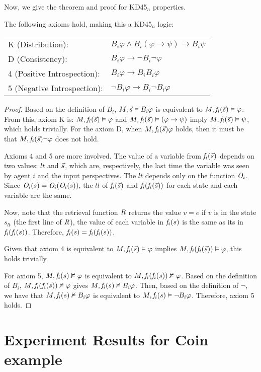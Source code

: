 \documentclass[letterpaper]{article} %
\begin{document}
Now, we give the theorem and proof for KD45$_n$ properties.
\begin{theorem}
\label{pos:kd45}
The following axioms hold, making this a KD45$_n$ logic:

\noindent
\vspace{2mm}
\begin{tabular}{l@{~~}l}
	K (Distribution):           & $B_i \varphi \land B_i(\varphi \rightarrow \psi) \rightarrow B_i \psi $\\[1mm]
	D (Consistency):            & $B_i \varphi \rightarrow \neg B_i \neg \varphi $\\[1mm]
	4 (Positive Introspection): & $B_i \varphi \rightarrow  B_i B_i \varphi $\\[1mm]
	5 (Negative Introspection): & $\neg B_i \varphi \rightarrow B_i \neg B_i \varphi $\\[1mm]
\end{tabular} 
\end{theorem}

\begin{proof}
    Based on the definition of $B_i$, $M,\Vec{s} \vDash B_i \varphi$ is equivalent to $M,\mathit{f}_i(\Vec{s}) \vDash \varphi$.
    From this, axiom K is: $M,\mathit{f}_i(\Vec{s}) \vDash \varphi$ and $M,\mathit{f}_i(\Vec{s}) \vDash (\varphi \rightarrow \psi)$ imply $M,\mathit{f}_i(\Vec{s}) \vDash \psi$, which holds trivially.
    For the axiom D, when $M,\mathit{f}_i(\Vec{s}) \varphi$ holds, then it must be that  $M,\mathit{f}_i(\Vec{s}) \neg \varphi$ does not hold.

    Axioms 4 and 5 are more involved.
    The value of a variable from $\mathit{f}_i(\Vec{s})$ depends on two values: $lt$ and $\Vec{s}$, which are, respectively, the last time the variable was seen by agent $i$ and the input perspectives.
    The $lt$ depends only on the function $\mathit{O}_i$.
    Since $\mathit{O}_i(s)=\mathit{O}_i(\mathit{O}_i(s))$, the $lt$ of $\mathit{f}_i(\Vec{s})$ and $\mathit{f}_i(\mathit{f}_i(\Vec{s}))$ for each state and each variable are the same.
    
    Now, note that the retrieval function $\mathit{R}$ returns the value $v=e$ if $v$ is in the state $s_{lt}$ (the first line of $\mathit{R}$), the value of each variable in $\mathit{f}_i(s)$ is the same as its in $\mathit{f}_i(\mathit{f}_i(s))$. Therefore, $\mathit{f}_i(s) = \mathit{f}_i(\mathit{f}_i(s))$. 

    Given that axiom 4 is equivalent to $M,\mathit{f}_i(\Vec{s}) \vDash \varphi$ implies $M,\mathit{f}_i(\mathit{f}_i(\Vec{s})) \vDash \varphi$, this holds trivially.
    
    For axiom 5, $M, \mathit{f}_i(s) \nvDash \varphi$ is equivalent to $M, \mathit{f}_i(\mathit{f}_i(s)) \nvDash \varphi$.
    Based on the definition of $B_i$, $M,\mathit{f}_i(\mathit{f}_i(s)) \nvDash \varphi$ gives $M,\mathit{f}_i(s) \nvDash B_i \varphi$.
    Then, based on the definition of $\neg$, we have that $M,\mathit{f}_i(s) \nvDash B_i \varphi$ is equivalent to $M,\mathit{f}_i(s) \vDash \neg B_i \varphi$. Therefore, axiom 5 holds.
\end{proof}

\section{Experiment Results for Coin example}
\end{document}
